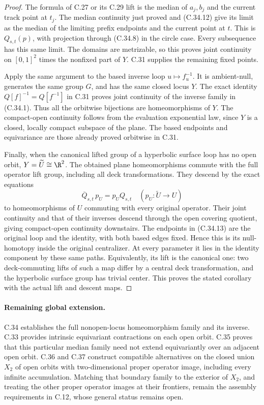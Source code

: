 \begin{proof}
The formula of C.27 or its C.29 lift is
the median of $a_j,b_j$ and the current
track point at $t_j$. The median continuity
just proved and (C.34.12) give its limit as
the median of the limiting prefix endpoints
and the current point at $t$. This is
$Q_{s,t}(p)$, with projection through
(C.34.8) in the circle case.
Every subsequence has this same limit.
The domains are metrizable, so this proves
joint continuity on $[0,1]^2$ times the
nonfixed part of $Y$. C.31 supplies the
remaining fixed points.

Apply the same argument to the based inverse
loop $u\mapsto f_u^{-1}$. It is ambient-null,
generates the same group $G$, and has the
same closed locus $Y$. The exact identity
$Q[f]^{-1}=Q[f^{-1}]$ in C.31 proves joint
continuity of the inverse family in
(C.34.1). Thus all the orbitwise bijections
are homeomorphisms of $Y$. The compact-open
continuity follows from the evaluation
exponential law, since $Y$ is a closed,
locally compact subspace of the plane.
The based endpoints and equivariance are
those already proved orbitwise in C.31.

Finally, when the canonical lifted group of
a hyperbolic surface loop has no open orbit,
$Y=\widetilde U\cong\R^2$.
The obtained plane homeomorphisms commute
with the full operator lift group, including
all deck transformations. They descend by
the exact equations
\[
                  \overline Q_{s,t}\,p_U=p_UQ_{s,t}
                 \quad(p_U:\widetilde U\to U)
                                                        \tag{C.34.13}
\]
to homeomorphisms of $U$ commuting with every
original operator. Their joint continuity
and that of their inverses descend through
the open covering quotient, giving
compact-open continuity downstairs.
The endpoints in (C.34.13) are the original
loop and the identity, with both based
edges fixed. Hence this is its null-homotopy
inside the original centralizer.
At every parameter it lies in the identity
component by these same paths.
Equivalently, its lift is the canonical
one: two deck-commuting lifts of such a
map differ by a central deck transformation,
and the hyperbolic surface group has trivial
center. This proves the stated corollary
with the actual lift and descent maps.
\end{proof}

\paragraph{Remaining global extension.}
C.34 establishes the full nonopen-locus
homeomorphism family and its inverse.
C.33 provides intrinsic equivariant
contractions on each open orbit.
C.35 proves that this particular median
family need not extend equivariantly over
an adjacent open orbit. C.36 and C.37
construct compatible alternatives on the
closed union $X_2$ of open orbits with
two-dimensional proper operator image,
including every infinite accumulation.
Matching that boundary family to the
exterior of $X_2$, and treating the other
proper operator images at their frontiers,
remain the assembly requirements in
C.12, whose general status remains open.
